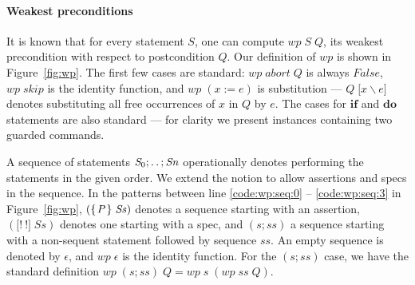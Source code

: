 \documentclass[runningheads]{llncs}
\newcommand{\Conid}[1]{\mathit{#1}}
\newcommand{\Varid}[1]{\mathit{#1}}
\let\Varid\mathit
\let\Conid\mathit
\newcommand{\todo}[1]{{\bf Todo}: \lbrack #1 \rbrack}
\begin{document}
\paragraph{Weakest preconditions}
It is known that for every statement \ensuremath{\Conid{S}}, one can compute \ensuremath{\Varid{wp}\;\Conid{S}\;\Conid{Q}}, its weakest precondition with respect to postcondition \ensuremath{\Conid{Q}}.
Our definition of \ensuremath{\Varid{wp}} is shown in Figure~\ref{fig:wp}.
The first few cases are standard: \ensuremath{\Varid{wp}\;\Varid{abort}\;\Conid{Q}} is always \ensuremath{\Conid{False}}, \ensuremath{\Varid{wp}\;\Varid{skip}} is the identity function, and \ensuremath{\Varid{wp}\;(\Varid{x}\mathbin{:=}\Varid{e})} is substitution --- \ensuremath{\Conid{Q}\;\lbrack\Varid{x}\backslash\Varid{e}\rbrack} denotes substituting all free occurrences of \ensuremath{\Varid{x}} in \ensuremath{\Conid{Q}} by \ensuremath{\Varid{e}}.
The cases for \ensuremath{\mathbf{if}} and \ensuremath{\mathbf{do}} statements are also standard --- for clarity we present instances containing two guarded commands.

A sequence of statements \ensuremath{\Conid{S}_{0};\mathinner{\ldotp\ldotp};\Conid{Sn}} operationally denotes performing the statements in the given order.
We extend the notion to allow assertions and specs in the sequence.
In the patterns between line \ref{code:wp:seq:0} -- \ref{code:wp:seq:3} in Figure~\ref{fig:wp},
\ensuremath{(\{\mskip1.5mu \Conid{P}\mskip1.5mu\}\;\Conid{Ss})} denotes a sequence starting with an assertion,
\ensuremath{(\lbrack!~!\rbrack\;\Conid{Ss})} denotes one starting with a spec,
and \ensuremath{(\Varid{s};\Varid{ss})} a sequence starting with a non-sequent statement followed by sequence \ensuremath{\Varid{ss}}.
An empty sequence is denoted by \ensuremath{\epsilon}, and \ensuremath{\Varid{wp}\;\epsilon} is the identity function.
For the \ensuremath{(\Varid{s};\Varid{ss})} case, we have the standard definition \ensuremath{\Varid{wp}\;(\Varid{s};\Varid{ss})\;\Conid{Q}\mathrel{=}\Varid{wp}\;\Varid{s}\;(\Varid{wp}\;\Varid{ss}\;\Conid{Q})}.
\end{document}
